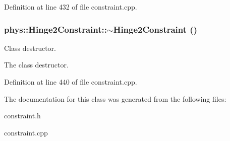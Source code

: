 Definition at line 432 of file constraint.cpp.

\hypertarget{classphys_1_1Hinge2Constraint_a8e3f1210140b8205e20e4a07a3e63195}{
\subsubsection[{$\sim$Hinge2Constraint}]{\setlength{\rightskip}{0pt plus 5cm}phys::Hinge2Constraint::$\sim$Hinge2Constraint ()}}
\label{d2/d16/classphys_1_1Hinge2Constraint_a8e3f1210140b8205e20e4a07a3e63195}


Class destructor. 

The class destructor. 

Definition at line 440 of file constraint.cpp.



The documentation for this class was generated from the following files:\begin{DoxyCompactItemize}
\item 
constraint.h\item 
constraint.cpp\end{DoxyCompactItemize}
